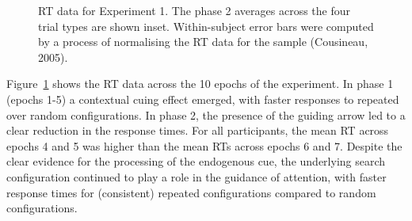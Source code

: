 \documentclass[
  man,
  floatsintext,
  longtable,
  nolmodern,
  notxfonts,
  notimes,
  colorlinks=true,linkcolor=blue,citecolor=blue,urlcolor=blue]{apa7}
\begin{document}
\begin{figure}[H]


\caption{\label{fig-RT-exp1}RT data for Experiment 1. The phase 2
averages across the four trial types are shown inset. Within-subject
error bars were computed by a process of normalising the RT data for the
sample (Cousineau, 2005).}

\end{figure}%

Figure~\ref{fig-RT-exp1} shows the RT data across the 10 epochs of the
experiment. In phase 1 (epochs 1-5) a contextual cuing effect emerged,
with faster responses to repeated over random configurations. In phase
2, the presence of the guiding arrow led to a clear reduction in the
response times. For all participants, the mean RT across epochs 4 and 5
was higher than the mean RTs across epochs 6 and 7. Despite the clear
evidence for the processing of the endogenous cue, the underlying search
configuration continued to play a role in the guidance of attention,
with faster response times for (consistent) repeated configurations
compared to random configurations.
\end{document}
